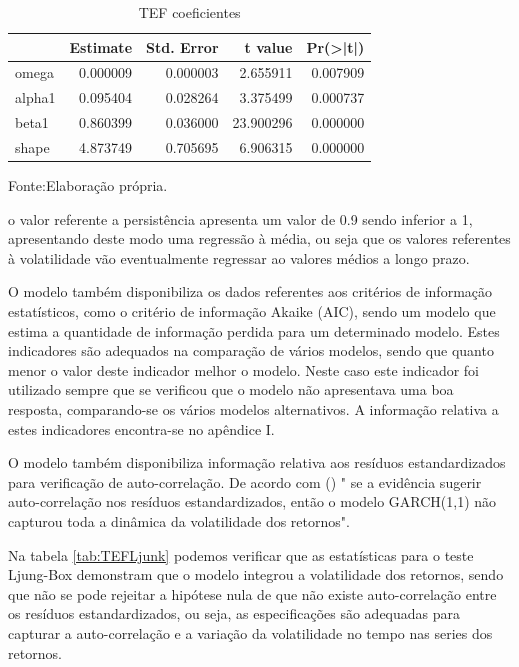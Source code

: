 \documentclass[
  12pt,
  a4paper,
  openany]{book}
\begin{document}
\normalsize

\begin{table}[!h]

\caption{\label{tab:tefcoefgarch}TEF coeficientes}
\centering
\begin{tabular}[t]{lrrrr}
\toprule
  &  Estimate &  Std. Error &  t value & Pr(>|t|)\\
\midrule
omega & 0.000009 & 0.000003 & 2.655911 & 0.007909\\
alpha1 & 0.095404 & 0.028264 & 3.375499 & 0.000737\\
beta1 & 0.860399 & 0.036000 & 23.900296 & 0.000000\\
shape & 4.873749 & 0.705695 & 6.906315 & 0.000000\\
\bottomrule
\end{tabular}
\end{table}
\FloatBarrier
\centering

Fonte:Elaboração própria.

\justifying
\bigskip

o valor referente a persistência apresenta um valor de 0.9 sendo inferior a 1, apresentando deste modo uma regressão à média, ou seja que os valores referentes à volatilidade vão eventualmente regressar ao valores médios a longo prazo.

O modelo também disponibiliza os dados referentes aos critérios de informação estatísticos, como o critério de informação Akaike (AIC), sendo um modelo que estima a quantidade de informação perdida para um determinado modelo. Estes indicadores são adequados na comparação de vários modelos, sendo que quanto menor o valor deste indicador melhor o modelo. Neste caso este indicador foi utilizado sempre que se verificou que o modelo não apresentava uma boa resposta, comparando-se os vários modelos alternativos. A informação relativa a estes indicadores encontra-se no apêndice I.

O modelo também disponibiliza informação relativa aos resíduos estandardizados para verificação de auto-correlação. De acordo com (\citet{rvol}) " se a evidência sugerir auto-correlação nos resíduos estandardizados, então o modelo GARCH(1,1) não capturou toda a dinâmica da volatilidade dos retornos".

Na tabela \ref{tab:TEFLjunk} podemos verificar que as estatísticas para o teste Ljung-Box demonstram que o modelo integrou a volatilidade dos retornos, sendo que não se pode rejeitar a hipótese nula de que não existe auto-correlação entre os resíduos estandardizados, ou seja, as especificações são adequadas para capturar a auto-correlação e a variação da volatilidade no tempo nas series dos retornos.
\end{document}
